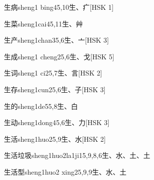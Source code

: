 \begin{entry}{生病}{sheng1 bing4}{5,10}{⽣、⽧}[HSK 1]
\end{entry}

\begin{entry}{生菜}{sheng1cai4}{5,11}{⽣、⾋}
\end{entry}

\begin{entry}{生产}{sheng1chan3}{5,6}{⽣、⼇}[HSK 3]
\end{entry}

\begin{entry}{生成}{sheng1 cheng2}{5,6}{⽣、⼽}[HSK 5]
\end{entry}

\begin{entry}{生词}{sheng1 ci2}{5,7}{⽣、⾔}[HSK 2]
\end{entry}

\begin{entry}{生存}{sheng1cun2}{5,6}{⽣、⼦}[HSK 3]
\end{entry}

\begin{entry}{生的}{sheng1de5}{5,8}{⽣、⽩}
\end{entry}

\begin{entry}{生动}{sheng1dong4}{5,6}{⽣、⼒}[HSK 3]
\end{entry}

\begin{entry}{生活}{sheng1huo2}{5,9}{⽣、⽔}[HSK 2]
\end{entry}

\begin{entry}{生活垃圾}{sheng1huo2la1ji1}{5,9,8,6}{⽣、⽔、⼟、⼟}
\end{entry}

\begin{entry}{生活型}{sheng1huo2 xing2}{5,9,9}{⽣、⽔、⼟}
\end{entry}

